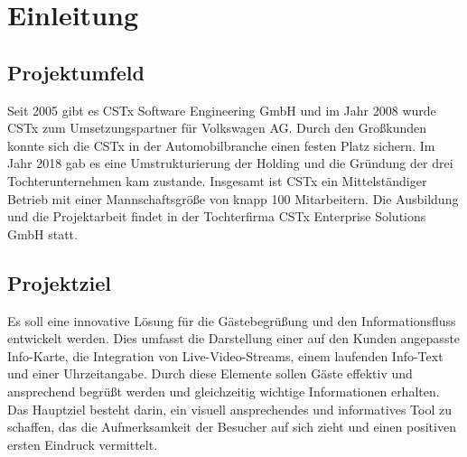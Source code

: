 \section{Einleitung}
\label{sec:Einleitung}


\subsection{Projektumfeld} 
\label{sec:Projektumfeld}
Seit 2005 gibt es CSTx Software Engineering GmbH und im Jahr 2008 wurde CSTx zum Umsetzungspartner für Volkswagen AG.
Durch den Großkunden konnte sich die CSTx in der Automobilbranche einen festen Platz sichern.
Im Jahr 2018 gab es eine Umstrukturierung der Holding und die Gründung der drei Tochterunternehmen kam zustande.
Insgesamt ist CSTx ein Mittelständiger Betrieb mit einer Mannschaftsgröße von knapp 100 Mitarbeitern.
Die Ausbildung und die Projektarbeit findet in der Tochterfirma CSTx Enterprise Solutions GmbH statt.



\subsection{Projektziel} 
\label{sec:Projektziel}
Es soll eine innovative Lösung für die Gästebegrüßung und den Informationsfluss entwickelt werden. 
Dies umfasst die Darstellung einer auf den Kunden angepasste Info-Karte, die Integration von Live-Video-Streams, einem laufenden Info-Text und einer Uhrzeitangabe. 
Durch diese Elemente sollen Gäste effektiv und ansprechend begrüßt werden und gleichzeitig wichtige Informationen erhalten. 
Das Hauptziel besteht darin, ein visuell ansprechendes und informatives Tool zu schaffen, das die Aufmerksamkeit der Besucher auf sich zieht und einen positiven ersten Eindruck vermittelt.


